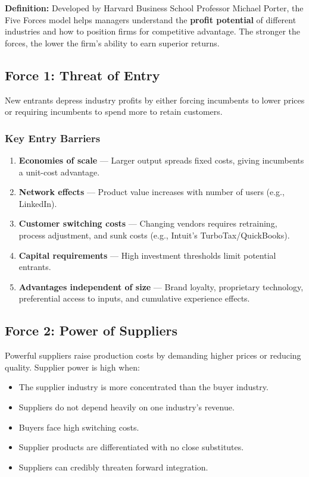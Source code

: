 \documentclass[11pt, letterpaper]{article}
\begin{document}
\begin{defbox}
\textbf{Definition:} Developed by Harvard Business School Professor Michael Porter, the Five Forces model helps managers understand the \textbf{profit potential} of different industries and how to position firms for competitive advantage. The stronger the forces, the lower the firm's ability to earn superior returns.
\end{defbox}

\subsection{Force 1: Threat of Entry}

New entrants depress industry profits by either forcing incumbents to lower prices or requiring incumbents to spend more to retain customers.

\subsubsection{Key Entry Barriers}
\begin{enumerate}[leftmargin=*, label=\arabic*.]
  \item \textbf{Economies of scale} --- Larger output spreads fixed costs, giving incumbents a unit-cost advantage.
  \item \textbf{Network effects} --- Product value increases with number of users (e.g., LinkedIn).
  \item \textbf{Customer switching costs} --- Changing vendors requires retraining, process adjustment, and sunk costs (e.g., Intuit's TurboTax/QuickBooks).
  \item \textbf{Capital requirements} --- High investment thresholds limit potential entrants.
  \item \textbf{Advantages independent of size} --- Brand loyalty, proprietary technology, preferential access to inputs, and cumulative experience effects.
\end{enumerate}

\subsection{Force 2: Power of Suppliers}

Powerful suppliers raise production costs by demanding higher prices or reducing quality. Supplier power is high when:

\begin{itemize}[leftmargin=*, label=--]
  \item The supplier industry is more concentrated than the buyer industry.
  \item Suppliers do not depend heavily on one industry's revenue.
  \item Buyers face high switching costs.
  \item Supplier products are differentiated with no close substitutes.
  \item Suppliers can credibly threaten forward integration.
\end{itemize}
\end{document}
